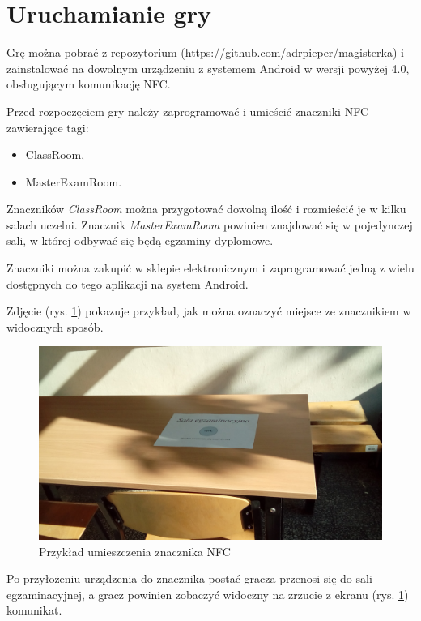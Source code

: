 \documentclass[openright]{xmgr}
\begin{document}
\section{Uruchamianie gry}

Grę można pobrać z repozytorium  (\url{https://github.com/adrpieper/magisterka}) i zainstalować na dowolnym urządzeniu z systemem Android w wersji powyżej 4.0, obsługującym komunikację NFC. 

Przed rozpoczęciem gry należy zaprogramować i umieścić znaczniki NFC zawierające tagi:
\begin{itemize}
	\item ClassRoom,
	\item MasterExamRoom.
\end{itemize}
Znaczników \textit{ClassRoom} można przygotować dowolną ilość i rozmieścić je w kilku salach uczelni. Znacznik \textit{MasterExamRoom} powinien znajdować się w pojedynczej sali, w której odbywać się będą egzaminy dyplomowe.

Znaczniki można zakupić w sklepie elektronicznym i zaprogramować jedną z wielu dostępnych do tego aplikacji na system Android.

Zdjęcie (rys. \ref{game:tag:example}) pokazuje przykład, jak można oznaczyć miejsce ze znacznikiem w widocznych sposób.
\begin{figure}[!tbh]
	\centering
	\includegraphics[width=0.8\hsize]{fig/tag_example}
	\caption{Przykład umieszczenia znacznika NFC}
	\label{game:tag:example}
\end{figure}

Po przyłożeniu urządzenia do znacznika postać gracza przenosi się do sali egzaminacyjnej, a gracz powinien zobaczyć widoczny na zrzucie z ekranu (rys. \ref{game:tag:example}) komunikat.
\end{document}
